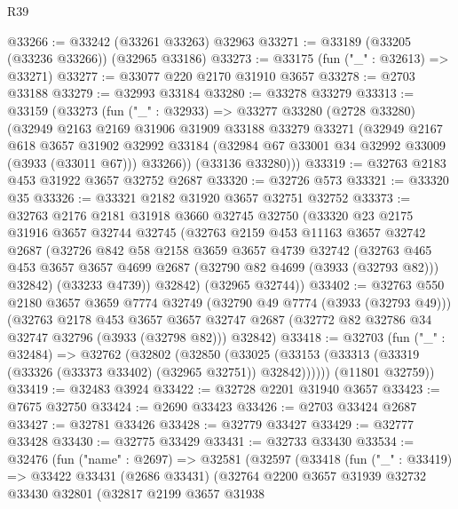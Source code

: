 \begin{lexlean}{R39}
\begin{coremodule}
@33266 := @33242 (@33261 @33263) @32963
@33271 := @33189 (@33205 (@33236 @33266)) (@32965 @33186)
@33273 := @33175 (fun ("_" : @32613) => @33271)
@33277 := @33077 @220 @2170 @31910 @3657
@33278 := @2703 @33188
@33279 := @32993 @33184
@33280 := @33278 @33279
@33313 := @33159
    (@33273
      (fun ("_" : @32933) =>
      @33277
        @33280
        (@2728 @33280)
        (@32949
          @2163
          @2169
          @31906
          @31909
          @33188
          @33279
          @33271
          (@32949
            @2167
            @618
            @3657
            @31902
            @32992
            @33184
            (@32984 @67 @33001 @34 @32992 @33009 (@3933 (@33011 @67)))
            @33266))
        (@33136 @33280)))
@33319 := @32763 @2183 @453 @31922 @3657 @32752 @2687
@33320 := @32726 @573
@33321 := @33320 @35
@33326 := @33321 @2182 @31920 @3657 @32751 @32752
@33373 := @32763
    @2176
    @2181
    @31918
    @3660
    @32745
    @32750
    (@33320
      @23
      @2175
      @31916
      @3657
      @32744
      @32745
      (@32763
        @2159
        @453
        @11163
        @3657
        @32742
        @2687
        (@32726
          @842
          @58
          @2158
          @3659
          @3657
          @4739
          @32742
          (@32763 @465 @453 @3657 @3657 @4699 @2687 (@32790 @82 @4699 (@3933 (@32793 @82))) @32842)
          (@33233 @4739))
        @32842)
      (@32965 @32744))
@33402 := @32763
    @550
    @2180
    @3657
    @3659
    @7774
    @32749
    (@32790 @49 @7774 (@3933 (@32793 @49)))
    (@32763
      @2178
      @453
      @3657
      @3657
      @32747
      @2687
      (@32772 @82 @32786 @34 @32747 @32796 (@3933 (@32798 @82)))
      @32842)
@33418 := @32703
    (fun ("_" : @32484) =>
    @32762
      (@32802
        (@32850
          (@33025 (@33153 (@33313 (@33319 (@33326 (@33373 @33402) (@32965 @32751)) @32842))))))
      (@11801 @32759))
@33419 := @32483 @3924
@33422 := @32728 @2201 @31940 @3657
@33423 := @7675 @32750
@33424 := @2690 @33423
@33426 := @2703 @33424 @2687
@33427 := @32781 @33426
@33428 := @32779 @33427
@33429 := @32777 @33428
@33430 := @32775 @33429
@33431 := @32733 @33430
@33534 := @32476
    (fun ("name" : @2697) =>
    @32581
      (@32597
        (@33418
          (fun ("_" : @33419) =>
          @33422
            @33431
            (@2686 @33431)
            (@32764
              @2200
              @3657
              @31939
              @32732
              @33430
              @32801
              (@32817
                @2199
                @3657
                @31938

\end{coremodule}
\end{lexlean}
